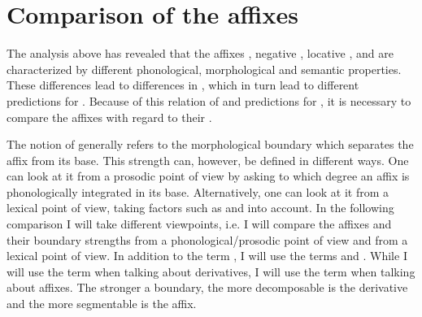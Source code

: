 \section{Comparison of the affixes}\label{comparison affixes}

The analysis above has revealed that the affixes , negative , locative ,  and  are characterized by different phonological, morphological and semantic properties. These differences lead to differences in , which in turn lead to different predictions for .  Because of this relation of  and predictions for , it is necessary to compare the affixes with regard to their . 

The notion of  generally refers to the morphological boundary which separates the affix from its base. This strength can, however, be defined in different ways. One can look at it from a prosodic point of view by asking to which degree an affix is phonologically integrated in its base. Alternatively, one can look at it from a lexical point of view, taking factors such as  and  into account. In the following comparison I will take different viewpoints, i.e. I will compare the affixes and their {boundary strengths} from a phonological/prosodic point of view and  from a lexical point of view. In addition to the term , I will use the terms  and . While I will use the term  when talking about derivatives, I will use the term  when talking about affixes. The stronger a boundary, the more decomposable is the derivative and the more segmentable is the affix.







